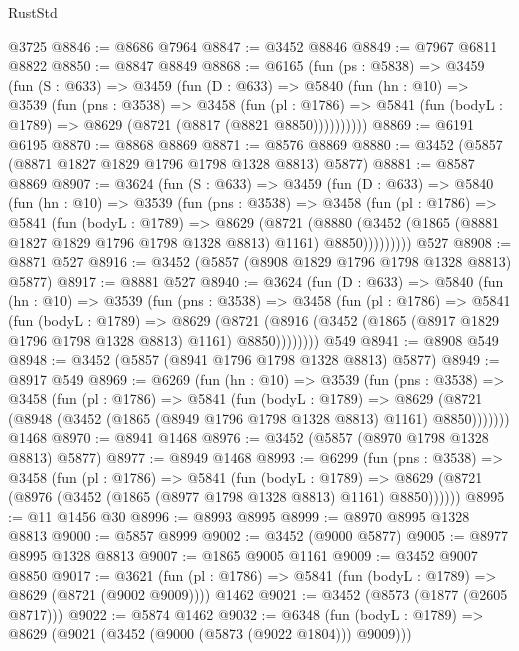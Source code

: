 \begin{lexlean}{RustStd}
\begin{coremodule}
    @3725
@8846 := @8686 @7964
@8847 := @3452 @8846
@8849 := @7967 @6811 @8822
@8850 := @8847 @8849
@8868 := @6165
    (fun (ps : @5838) =>
    @3459
      (fun (S : @633) =>
      @3459
        (fun (D : @633) =>
        @5840
          (fun (hn : @10) =>
          @3539
            (fun (pns : @3538) =>
            @3458
              (fun (pl : @1786) =>
              @5841 (fun (bodyL : @1789) => @8629 (@8721 (@8817 (@8821 @8850))))))))))
@8869 := @6191 @6195
@8870 := @8868 @8869
@8871 := @8576 @8869
@8880 := @3452 (@5857 (@8871 @1827 @1829 @1796 @1798 @1328 @8813) @5877)
@8881 := @8587 @8869
@8907 := @3624
    (fun (S : @633) =>
    @3459
      (fun (D : @633) =>
      @5840
        (fun (hn : @10) =>
        @3539
          (fun (pns : @3538) =>
          @3458
            (fun (pl : @1786) =>
            @5841
              (fun (bodyL : @1789) =>
              @8629
                (@8721
                  (@8880
                    (@3452 (@1865 (@8881 @1827 @1829 @1796 @1798 @1328 @8813) @1161) @8850)))))))))
    @527
@8908 := @8871 @527
@8916 := @3452 (@5857 (@8908 @1829 @1796 @1798 @1328 @8813) @5877)
@8917 := @8881 @527
@8940 := @3624
    (fun (D : @633) =>
    @5840
      (fun (hn : @10) =>
      @3539
        (fun (pns : @3538) =>
        @3458
          (fun (pl : @1786) =>
          @5841
            (fun (bodyL : @1789) =>
            @8629
              (@8721 (@8916 (@3452 (@1865 (@8917 @1829 @1796 @1798 @1328 @8813) @1161) @8850))))))))
    @549
@8941 := @8908 @549
@8948 := @3452 (@5857 (@8941 @1796 @1798 @1328 @8813) @5877)
@8949 := @8917 @549
@8969 := @6269
    (fun (hn : @10) =>
    @3539
      (fun (pns : @3538) =>
      @3458
        (fun (pl : @1786) =>
        @5841
          (fun (bodyL : @1789) =>
          @8629 (@8721 (@8948 (@3452 (@1865 (@8949 @1796 @1798 @1328 @8813) @1161) @8850)))))))
    @1468
@8970 := @8941 @1468
@8976 := @3452 (@5857 (@8970 @1798 @1328 @8813) @5877)
@8977 := @8949 @1468
@8993 := @6299
    (fun (pns : @3538) =>
    @3458
      (fun (pl : @1786) =>
      @5841
        (fun (bodyL : @1789) =>
        @8629 (@8721 (@8976 (@3452 (@1865 (@8977 @1798 @1328 @8813) @1161) @8850))))))
@8995 := @11 @1456 @30
@8996 := @8993 @8995
@8999 := @8970 @8995 @1328 @8813
@9000 := @5857 @8999
@9002 := @3452 (@9000 @5877)
@9005 := @8977 @8995 @1328 @8813
@9007 := @1865 @9005 @1161
@9009 := @3452 @9007 @8850
@9017 := @3621
    (fun (pl : @1786) => @5841 (fun (bodyL : @1789) => @8629 (@8721 (@9002 @9009))))
    @1462
@9021 := @3452 (@8573 (@1877 (@2605 @8717)))
@9022 := @5874 @1462
@9032 := @6348
    (fun (bodyL : @1789) => @8629 (@9021 (@3452 (@9000 (@5873 (@9022 @1804))) @9009)))

\end{coremodule}
\end{lexlean}
